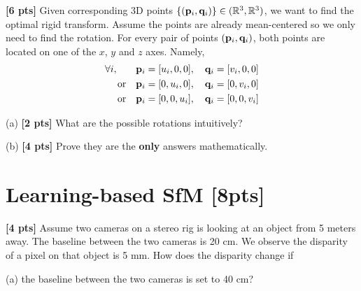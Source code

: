 \begin{questions}
    \begin{tcolorbox}[fit,height fill, width=\textwidth, blank, borderline={0.5pt}{-2pt},halign=left, valign=center, nobeforeafter]


    \end{tcolorbox}

    \question \textbf{[6 pts]} Given corresponding 3D points $\{(\mathbf{p}_i, \mathbf{q}_i)\} \in (\mathbb{R}^3, \mathbb{R}^3)$, we want to find the optimal rigid transform. Assume the points are already mean-centered so we only need to find the rotation. For every pair of points $(\mathbf{p}_i, \mathbf{q}_i)$, both points are located on one of the $x$, $y$ and $z$ axes. Namely,
    \begin{align*}
        \forall i, \qquad & \mathbf{p}_i = [u_i, 0, 0], \quad \mathbf{q}_i = [v_i, 0, 0] \\
        \text{or} \quad   & \mathbf{p}_i = [0, u_i, 0], \quad \mathbf{q}_i = [0, v_i, 0] \\
        \text{or} \quad   & \mathbf{p}_i = [0, 0, u_i], \quad \mathbf{q}_i = [0, 0, v_i] \\
    \end{align*}

    (a) \textbf{[2 pts]}  What are the possible rotations intuitively?

    \begin{tcolorbox}[fit,height=7cm, width=\textwidth, blank, borderline={0.5pt}{-2pt},halign=left, valign=center, nobeforeafter]


    \end{tcolorbox}

    (b) \textbf{[4 pts]} Prove they are the \textbf{only} answers mathematically.

    \begin{tcolorbox}[fit,height fill, width=\textwidth, blank, borderline={0.5pt}{-2pt},halign=left, valign=center, nobeforeafter]

    \end{tcolorbox}


    \section{Learning-based SfM [8pts]}

    \question \textbf{[4 pts]} Assume two cameras on a stereo rig is looking at an object from 5 meters away. The baseline between the two cameras is 20 cm. We observe the disparity of a pixel on that object is 5 mm. How does the disparity change if

    (a) the baseline between the two cameras is set to 40 cm?


\end{questions}
